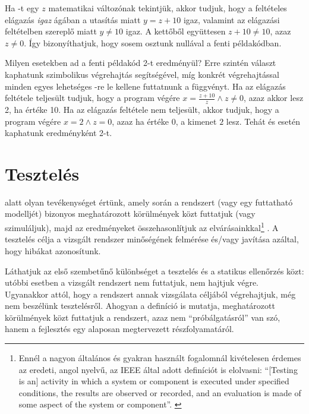 \begin{megjegyzes}
Ha -t egy $z$ matematikai változónak tekintjük, akkor tudjuk, hogy a feltételes elágazás \emph{igaz} ágában a  utasítás miatt $y = z + 10$ igaz, valamint az elágazási feltételben szereplő  miatt $y \neq 10$ igaz. A kettőből együttesen $z + 10 \neq 10$, azaz $z \neq 0$. Így bizonyíthatjuk, hogy sosem osztunk nullával a fenti példakódban.
\end{megjegyzes}

\begin{megjegyzes}
Milyen esetekben ad a fenti példakód 2-t eredményül? Erre szintén választ kaphatunk szimbolikus végrehajtás segítségével, míg konkrét végrehajtással minden egyes lehetséges -re le kellene futtatnunk a függvényt. Ha az elágazás feltétele teljesült tudjuk, hogy a program végére $x = \frac{z+10}{z} \wedge z \neq 0$, azaz  akkor lesz 2, ha  értéke 10. Ha az elágazás feltétele nem teljesült, akkor tudjuk, hogy a program végére $x = 2 \wedge z = 0$, azaz ha  értéke 0, a kimenet $2$ lesz. Tehát  és  esetén kaphatunk eredményként 2-t.
\end{megjegyzes}




\section{Tesztelés}\label{sec:teszteles}

 alatt olyan tevékenységet értünk, amely során a rendszert (vagy egy futtatható modelljét) bizonyos meghatározott körülmények közt futtatjuk (vagy szimuláljuk), majd az eredményeket összehasonlítjuk az elvárásainkkal\footnote{Ennél a nagyon általános és gyakran használt fogalomnál kivételesen érdemes az eredeti, angol nyelvű, az IEEE által adott definíciót is elolvasni: ``[Testing is an] activity in which a system or component is executed under specified conditions, the results are observed or recorded, and an evaluation is made of some aspect of the system or component''. \cite{IEEE-24765}} \cite{IEEE-24765}. A tesztelés célja a vizsgált rendszer minőségének felmérése és/vagy javítása azáltal, hogy hibákat azonosítunk. 

Láthatjuk az első szembetűnő különbséget a tesztelés és a statikus ellenőrzés közt: utóbbi esetben a vizsgált rendszert nem futtatjuk, nem hajtjuk végre. Ugyanakkor attól, hogy a rendszert annak vizsgálata céljából végrehajtjuk, még nem beszélünk tesztelésről. Ahogyan a definíció is mutatja, meghatározott körülmények közt futtatjuk a rendszert, azaz nem ``próbálgatásról'' van szó, hanem a fejlesztés egy alaposan megtervezett részfolyamatáról.

